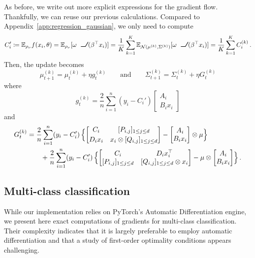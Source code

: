\documentclass{custom}
\begin{document}
As before, we write out more explicit expressions for the gradient flow.
Thankfully, we can reuse our previous calculations.
Compared to Appendix~\ref{app:regression_gaussian}, we only need to compute 
\[
C_{i}'\coloneqq\mathbb{E}_{\rho_\nu}f(x_{i},\theta)=\mathbb{E}_{\rho_{\nu}}[\omega\ReLU(\beta^\top x_i)]
=\frac{1}{K}\sum_{k=1}^{K}\mathbb{E}_{\mathcal{N}(\mu^{(k)},\Sigma^{(k)})}[\omega\ReLU(\beta^\top x_i)]=\frac{1}{K}\sum_{k=1}^{K}C_{i}^{(k)}\,.
\]
Then, the update becomes
\[
\mu_{t+1}^{(k)}=\mu_{t}^{(k)}+\eta g_{t}^{(k)}\qquad\text{and}\qquad\Sigma_{t+1}^{(k)}=\Sigma_{t}^{(k)}+\eta G_{t}^{(k)}
\]
where
\[
g_{t}^{(k)}=\frac{2}{n}\sum_{i=1}^{n}(y_{i}-C_{i}')\begin{bmatrix}
A_{i}\\
B_{i}x_{i}
\end{bmatrix}
\]
and
\begin{align*}
G_{t}^{(k)}
& =\frac{2}{n}\sum_{i=1}^{n}(y_{i}-C_{i}')\,\Bigl\{ \begin{bmatrix}
C_{i} & [P_{i,j}]_{1\leq j\leq d}\\[0.25em]
D_{i}x_{i} & x_{i}\otimes[Q_{i,j}]_{1\leq j\leq d}
\end{bmatrix}-\begin{bmatrix}
A_{i}\\
B_{i}x_{i}
\end{bmatrix}\otimes\mu\Bigr\} \\
 & \qquad+\frac{2}{n}\sum_{i=1}^{n}(y_{i}-C_{i}')\,\Bigl\{ \begin{bmatrix}
C_{i} & D_{i}x_{i}^{\top}\\
[P_{i,j}]_{1\leq j\leq d} & [Q_{i,j}]_{1\leq j\leq d}\otimes x_{i}
\end{bmatrix}-\mu\otimes\begin{bmatrix}
A_{i}\\
B_{i}x_{i}
\end{bmatrix}\Bigr\}\, .
\end{align*}


\subsection{Multi-class classification} 


While our implementation relies on PyTorch's Automatic Differentiation engine, we present here exact computations of gradients for multi-class classification. Their complexity indicates that it is largely preferable to employ automatic differentiation and that a study of first-order optimality conditions appears challenging.
\end{document}
